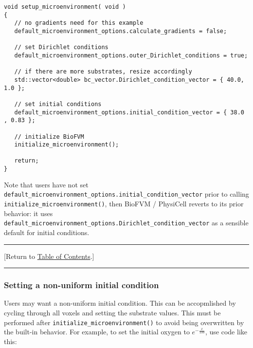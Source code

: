 \documentclass[12pt]{article}
\renewcommand{\v}{\verb}
\newcommand{\TOClink}{\begin{center}\hrule\vskip-5pt\phantom{.}\hfill[Return to \hyperlink{TOC}{Table of Contents}.]\hfill\phantom{.}\vskip3pt\hrule\end{center}}
\begin{document}
\begin{verbatim}
void setup_microenvironment( void )
{
   // no gradients need for this example 
   default_microenvironment_options.calculate_gradients = false; 
	
   // set Dirichlet conditions 
   default_microenvironment_options.outer_Dirichlet_conditions = true;
	
   // if there are more substrates, resize accordingly 
   std::vector<double> bc_vector.Dirichlet_condition_vector = { 40.0, 1.0 };
	 	
   // set initial conditions 
   default_microenvironment_options.initial_condition_vector = { 38.0 , 0.83 }; 
	
   // initialize BioFVM 
   initialize_microenvironment(); 	
	
   return; 
}
\end{verbatim}

Note that users have not set \v|default_microenvironment_options.initial_condition_vector| prior 
to calling \v|initialize_microenvironment()|, then BioFVM / PhysiCell reverts to its prior behavior: 
it uses \v|default_microenvironment_options.Dirichlet_condition_vector| as a sensible 
default for initial conditions. 

\TOClink

\subsubsection{Setting a non-uniform initial condition} 
\label{sec:BioFVM_nonuniform_initial_condition}

Users may want a non-uniform initial condition. This can be accopmlished 
by cycling through all voxels and setting the substrate values. This must be 
performed after \v|initialize_microenvironment()| to avoid being overwritten by the 
built-in behavior. For example, to set the initial oxygen to $e^{-\frac{x}{100}}$, 
use code like this:
\end{document}
